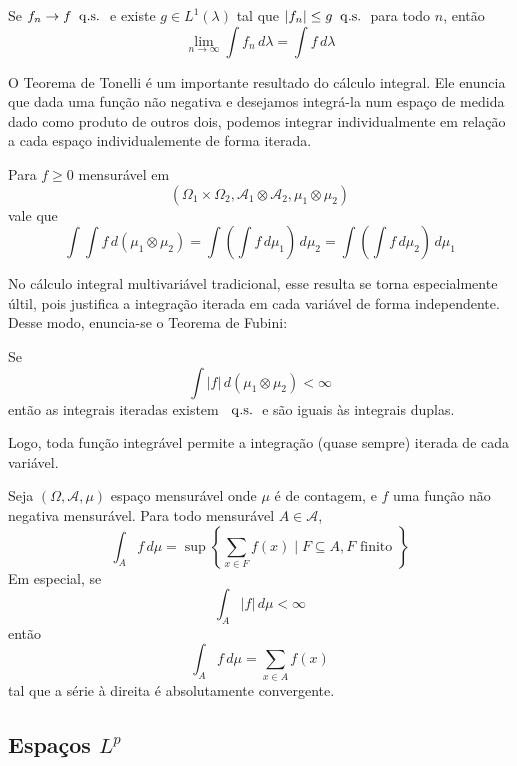 \begin{thm:convergencia dominada}
\label{thm:convergencia dominada}
Se $f_n \to f \;\;\mathrm{q.s.}\;$ e existe $g \in L^1(\lambda)$ tal que $|f_n| \le g \;\;\mathrm{q.s.}\;$ para todo $n$,
então
\[
	\lim_{n \to \infty} \int f_n\, d\lambda = \int f\, d\lambda
\]
\end{thm:convergencia dominada}

O Teorema de Tonelli é um importante resultado do cálculo integral.
Ele enuncia que dada uma função não negativa e desejamos integrá-la
num espaço de medida dado como produto de outros dois, podemos
integrar individualmente em relação a cada espaço individualemente
de forma iterada.

\begin{thm:toneli}
Para $f \ge 0$ mensurável em
\[
	(\Omega_1 \times \Omega_2, \mathcal{A}_1 \otimes \mathcal{A}_2, \mu_1 \otimes \mu_2)
\]
vale que
\[
	\int \int f\, d(\mu_1 \otimes \mu_2) = \int \left(\int f\, d\mu_1\right)\,d\mu_2 = \int \left(\int f\, d\mu_2\right)\,d\mu_1
\]
\end{thm:toneli}

No cálculo integral multivariável tradicional, esse resulta se torna especialmente últil,
pois justifica a integração iterada em cada variável de forma independente.
Desse modo, enuncia-se o Teorema de Fubini:

\begin{thm:fubini}
Se
\[
	\int |f|\, d(\mu_1 \otimes \mu_2) < \infty
\]
então as integrais iteradas existem $\;\;\mathrm{q.s.}\;$ e são iguais às integrais duplas.
\end{thm:fubini}

Logo, toda função integrável permite a integração (quase sempre) iterada de cada
variável.

\begin{thm:integrcao contagem}
\label{thm:integracao contagem}
Seja $(\Omega, \mathcal{A}, \mu)$ espaço mensurável onde $\mu$ é de contagem, e
$f$ uma função não negativa mensurável.
Para todo mensurável $A \in \mathcal{A}$,
\[
	\int_A f\, d\mu = \sup \left\{\sum_{x \in F} f(x) \mid F \subseteq A, F \text{ finito }\right\}
\]
Em especial, se
\[
	\int_A |f|\, d\mu < \infty
\]
então
\[
	\int_A f\, d\mu = \sum_{x \in A} f(x)
\]
tal que a série à direita é absolutamente convergente.
\end{thm:integrcao contagem}

\subsection{Espaços $L^p$}


